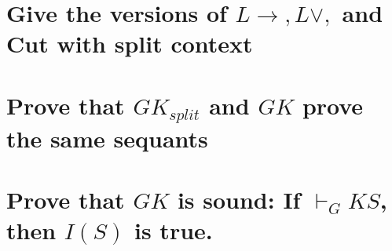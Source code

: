 \documentclass{article}
\begin{document}
\section{Give the versions of $L \to, L\vee,$ and Cut with split context}
\begin{prooftree}
\end{prooftree}
\begin{prooftree}
\end{prooftree}
\begin{prooftree}
\end{prooftree}
\section{Prove that $GK_{split}$ and $GK$ prove the same sequants}
\section{Prove that $GK$ is sound: If $\vdash_GK S$, then $I(S)$ is true.}
\end{document}
